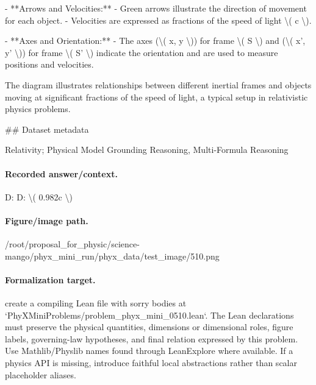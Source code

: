 - **Arrows and Velocities:**
  - Green arrows illustrate the direction of movement for each object.
  - Velocities are expressed as fractions of the speed of light \textbackslash{}( c \textbackslash{}).

- **Axes and Orientation:**
  - The axes (\textbackslash{}( x, y \textbackslash{})) for frame \textbackslash{}( S \textbackslash{}) and (\textbackslash{}( x', y' \textbackslash{})) for frame \textbackslash{}( S' \textbackslash{}) indicate the orientation and are used to measure positions and velocities.

The diagram illustrates relationships between different inertial frames and objects moving at significant fractions of the speed of light, a typical setup in relativistic physics problems.

\#\# Dataset metadata

Relativity; Physical Model Grounding Reasoning, Multi-Formula Reasoning

\paragraph{Recorded answer/context.}
D: D: \textbackslash{}( 0.982c \textbackslash{})

\paragraph{Figure/image path.}
/root/proposal\_for\_physic/science-mango/phyx\_mini\_run/phyx\_data/test\_image/510.png

\paragraph{Formalization target.}
create a compiling Lean file with sorry bodies at `PhyXMiniProblems/problem\_phyx\_mini\_0510.lean`. The Lean declarations must preserve the physical quantities, dimensions or dimensional roles, figure labels, governing-law hypotheses, and final relation expressed by this problem.
Use Mathlib/Physlib names found through LeanExplore where available. If a physics API is missing, introduce faithful local abstractions rather than scalar placeholder aliases.

